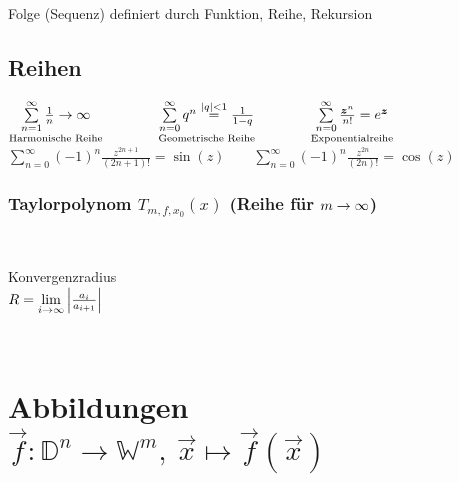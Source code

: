 \documentclass[german]{latex4ei/latex4ei_sheet}
\begin{document}
\begin{sectionbox}
	Folge (Sequenz) definiert durch Funktion, Reihe, Rekursion\\

	\subsection{Reihen}
	$\underset{\text{Harmonische Reihe}}{\sum\limits_{n=1}^\infty \frac{1}{n} \rightarrow \infty} \qquad\qquad   \underset{\text{Geometrische Reihe}}{\sum\limits_{n=0}^\infty q^n \stackrel{|q|<1}= \frac{1}{1-q}}  \qquad\qquad \underset{\text{Exponentialreihe}}{\sum\limits_{n = 0}^{\infty} \frac{\boldsymbol{z}^n}{n!} = e^{\boldsymbol{z}}}$\\[0.5em]
	$\sum\limits_{n = 0}^{\infty} (-1)^n \frac{z^{2n +1}}{(2n +1)!} = \sin(z) \qquad \sum\limits_{n = 0}^{\infty} (-1)^n \frac{z^{2n}}{(2n)!} = \cos(z)$\\

	\subsubsection{Taylorpolynom $T_{m,f,x_0}(x)$ (Reihe für $m \rightarrow \infty$)}
	 \ \parbox{3.0cm}{ Konvergenzradius \\ $R=\underset{i\rightarrow \infty}{\lim} \left\vert\frac{a_i}{a_{i+1}}\right\vert$ }\\
\end{sectionbox}


\section[Abbildungen]{Abbildungen $\vec f:\mathbb D^n \rightarrow \mathbb W^m,\ \vec x \mapsto \vec f(\vec x)$ }
\end{document}
